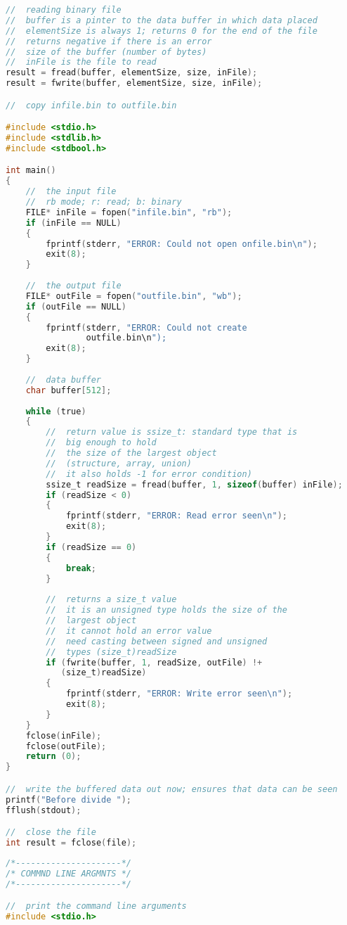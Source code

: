 \documentclass[8pt]{extarticle}
\begin{document}
\begin{small}
\begin{multicols}{2}
\begin{lstlisting}[language=C]
//  reading binary file
//  buffer is a pinter to the data buffer in which data placed
//  elementSize is always 1; returns 0 for the end of the file
//  returns negative if there is an error
//  size of the buffer (number of bytes)
//  inFile is the file to read
result = fread(buffer, elementSize, size, inFile);
result = fwrite(buffer, elementSize, size, inFile);

//  copy infile.bin to outfile.bin

#include <stdio.h>
#include <stdlib.h>
#include <stdbool.h>

int main()
{
	//  the input file
	//  rb mode; r: read; b: binary
	FILE* inFile = fopen("infile.bin", "rb");
	if (inFile == NULL)
	{
		fprintf(stderr, "ERROR: Could not open onfile.bin\n");
		exit(8);
	}
	
	//  the output file
	FILE* outFile = fopen("outfile.bin", "wb");
	if (outFile == NULL)
	{
		fprintf(stderr, "ERROR: Could not create 
				outfile.bin\n");
		exit(8);
	}
	
	//  data buffer
	char buffer[512];
	
	while (true)
	{
		//  return value is ssize_t: standard type that is 
		//  big enough to hold 
		//  the size of the largest object
		//  (structure, array, union)
		//  it also holds -1 for error condition)
		ssize_t readSize = fread(buffer, 1, sizeof(buffer) inFile);
		if (readSize < 0)
		{
			fprintf(stderr, "ERROR: Read error seen\n");
			exit(8);
		}
		if (readSize == 0)
		{
			break;
		}
		
		//  returns a size_t value
		//  it is an unsigned type holds the size of the 
		//  largest object
		//  it cannot hold an error value
		//  need casting between signed and unsigned 
		//  types (size_t)readSize
		if (fwrite(buffer, 1, readSize, outFile) !+
		   (size_t)readSize)
		{
			fprintf(stderr, "ERROR: Write error seen\n");
			exit(8);
		}
	}
	fclose(inFile);
	fclose(outFile);
	return (0);
}

//  write the buffered data out now; ensures that data can be seen
printf("Before divide ");
fflush(stdout);

//  close the file
int result = fclose(file);

\end{lstlisting}

\begin{lstlisting}[language=C]
/*---------------------*/
/* COMMND LINE ARGMNTS */
/*---------------------*/

//  print the command line arguments
#include <stdio.h>


\end{lstlisting}
\end{multicols}
\end{small}
\end{document}
